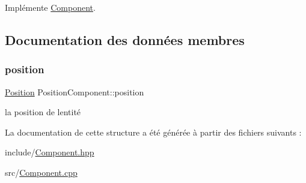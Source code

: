 Implémente \hyperlink{structComponent_a1d42068fda4a9bf6571810f669b3bb21}{Component}.



\subsection{Documentation des données membres}
\mbox{\label{structPositionComponent_a7fa8d03108cdb0645f12016ba8cd59c9}} 
\subsubsection{\texorpdfstring{position}{position}}
{\footnotesize\ttfamily \hyperlink{structPosition}{Position} Position\+Component\+::position}

la position de l\textquotesingle{}entité 

La documentation de cette structure a été générée à partir des fichiers suivants \+:\begin{DoxyCompactItemize}
\item 
include/\hyperlink{Component_8hpp}{Component.\+hpp}\item 
src/\hyperlink{Component_8cpp}{Component.\+cpp}\end{DoxyCompactItemize}
